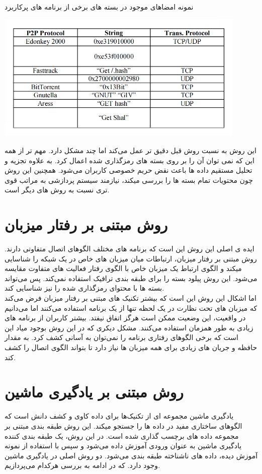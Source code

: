 \begin{table}[!h]
\caption[نمونه امضاهای موجود در بسته های برخی از برنامه های پرکاربرد]{نمونه امضاهای موجود در بسته های برخی از برنامه های پرکاربرد\cite{shafiq2016network}}
\centerline{\includegraphics[width=0.9\textwidth]{signature.PNG}}
\end{table}

این روش به نسبت روش قبل دقیق تر عمل می‌کند اما چند مشکل دارد. مهم تر از همه این که نمی توان آن را بر روی بسته های رمزگذاری شده اعمال کرد. به علاوه تجزیه و تحلیل مستقیم داده ها باعث نقض حریم خصوصی کاربران می‌شود. همچنین این روش چون محتویات تمام بسته ها را بررسی میکند، نیازمند سیستم پردازشی به مراتب قوی تری نسبت به روش های دیگر است.

\section{روش مبتنی بر رفتار میزبان  }
ایده ی اصلی این روش این است که برنامه های مختلف الگوهای اتصال متفاوتی دارند. روش مبتنی بر رفتار میزبان، ارتباطات میان میزبان های خاص در یک شبکه را شناسایی میکند و الگوی ارتباط یک میزبان خاص با الگوی رفتار فعالیت های متفاوت مقایسه می‌شود. این روش پیلود بسته را برای طبقه بندی ترافیک استفاده نمی‌کند. پس می‌تواند بسته ها با محتوای رمزگذاری شده را نیز شناسایی کند.
\\
اما اشکال این روش این است که بیشتر تکنیک های مبتنی بر رفتار میزبان فرض می‌کند که میزبان های تحت نظارت در یک لحظه تنها از یک برنامه استفاده می‌کنند اما می‌دانیم در واقعیت، این وضعیت ممکن است هرگز اتفاق نیفتد. بیشتر کاربران از برنامه های زیادی به طور همزمان استفاده می‌کنند.
مشکل دیکری که در این روش بوجود میاد این است که برخی الگوهای رفتاری برنامه را نمی‌توان به آسانی کشف کرد. به مقدار حافظه و جریان های زیادی برای همه میزبان ها نیاز دارد تا بتواند الگوی اتصال را کشف کند. \cite{jangal}

\section{روش مبتنی بر یادگیری ماشین  }
یادگیری ماشین مجموعه ای از تکنیک‌ها برای داده کاوی و کشف دانش است که الگوهای ساختاری مفید در داده ها را جستجو میکند. این روش طبقه بندی مبتنی بر مجموعه داده های برچسب گذاری شده است. در این روش، یک طبقه بندی کننده یادگیری ماشین به عنوان ورودی آموزش داده می‌شود و سپس با استفاده از نمونه آموزش دیده، داده های ناشناخته طبقه بندی می‌شود.
دو روش اصلی در یادگیری ماشین وجود دارد. که در ادامه به بررسی هرکدام می‌پردازیم.

